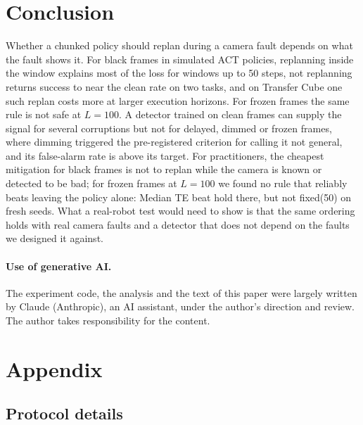 \documentclass[11pt]{article}
\newcommand{\fixed}{\textsf{fixed}\xspace}
\begin{document}
\section{Conclusion}
\label{sec:conclusion}

Whether a chunked policy should replan during a camera fault depends on what the fault shows it. For black frames in simulated ACT policies, replanning inside the window explains most of the loss for windows up to 50 steps, not replanning returns success to near the clean rate on two tasks, and on Transfer Cube one such replan costs more at larger execution horizons. For frozen frames the same rule is not safe at $L{=}100$. A detector trained on clean frames can supply the signal for several corruptions but not for delayed, dimmed or frozen frames, where dimming triggered the pre-registered criterion for calling it not general, and its false-alarm rate is above its target. For practitioners, the cheapest mitigation for black frames is not to replan while the camera is known or detected to be bad; for frozen frames at $L{=}100$ we found no rule that reliably beats leaving the policy alone: Median TE beat hold there, but not \fixed(50) on fresh seeds. What a real-robot test would need to show is that the same ordering holds with real camera faults and a detector that does not depend on the faults we designed it against.

\paragraph{Use of generative AI.} The experiment code, the analysis and the text of this paper were largely written by Claude (Anthropic), an AI assistant, under the author's direction and review. The author takes responsibility for the content.




\appendix
\section{Appendix}

\subsection{Protocol details}\label{app:protocol}
\end{document}
